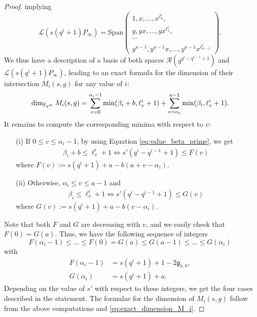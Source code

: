 \documentclass[peerreview]{IEEEtran}
\theoremstyle{plain}
\theoremstyle{definition}
\theoremstyle{remark}
\newcommand{\calL}{\mathcal{L}}
\newcommand{\calR}{\mathcal{R}}
\newcommand{\fqm}{\mathbb{F}_{q^m}}
\begin{document}
\begin{proof}
		implying
		\begin{equation*}
			\calL(s(q^i+1)P_\infty) = \mathrm{Span}    \left( \begin{array}{c}
				1,x,\dots,x^{\ell^i_0},   \\
				y,yx,\dots,yx^{\ell^i_1}, \\
				\cdots \\
				y^{a-1},y^{a-1}x,\dots,y^{a-1}x^{\ell^i_{a-1}}
			\end{array}
			\right).
		\end{equation*}
		We thus have a description of a basis of both spaces $\calR(g^{q^i-q^{i-1}+1})$ and $\calL(s(q^i+1)P_\infty)$, leading to an exact formula for the dimension of their intersection $M_i(s,g)$ for any value of $i$:
		\begin{equation}
			\label{eq:exact_dimension_M_i}
			\dim_{\fqm} M_i(s,g) = \sum\limits_{v=0}^{\alpha_i-1} \min(\beta_i+b,\ell_v^i+1) \\ + \sum\limits_{v=\alpha_i}^{a-1} \min(\beta_i,\ell_v^i+1).
		\end{equation}
		It remains to compute the corresponding minima with respect to $v$:
		\begin{itemize}
			\item[(i)] If $0 \leq v \leq \alpha_i-1$, by using Equation \eqref{eq:value_beta_prime}, we get
			\begin{align*}
				\beta_i+b \leq \ell_v^i +1 \iff s'(q^i-q^{i-1}+1) \leq F(v)
			\end{align*}
		where $F(v) := s(q^i+1)+a-b(a+v-\alpha_i)$.
			\item[(ii)] Otherwise, $\alpha_i \leq v \leq a-1$ and
			\begin{align*}
				\beta_i \leq \ell_v^i +1 \iff s'(q^i-q^{i-1}+1) \leq G(v)
			\end{align*}
		where $G(v) := s(q^i+1)+a-b(v-\alpha_i)$.
		\end{itemize}
		Note that both $F$ and $G$ are decreasing with $v$, and we easily check that $F(0) = G(a)$. Thus, we have the following sequence of integers
		$$F(\alpha_i-1) \leq \dots \leq F(0) = G(a) \leq G(a-1) \leq \dots \leq G(\alpha_i)$$
		with 
		\begin{align*}
			F(\alpha_i-1)&=s(q^i+1)+1-2\mathfrak{g}_{a,b},\\
			G(\alpha_i)&= s(q^i+1)+a.
		\end{align*}
		Depending on the value of $s'$ with respect to these integers, we get the four cases described in the statement. The formulae for the dimension of $M_i(s,g)$ follow from the above computations and \eqref{eq:exact_dimension_M_i}.

\end{proof}
\end{document}
